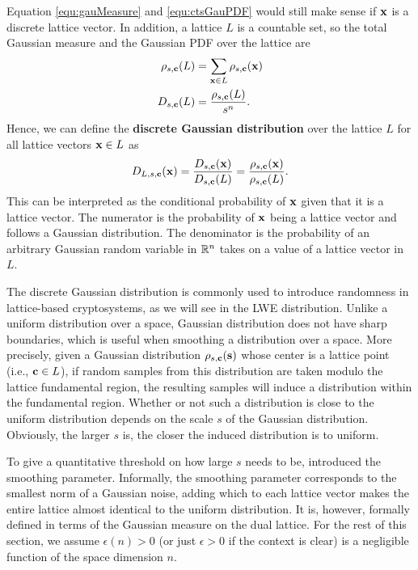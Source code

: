 \documentclass[../main.tex]{subfiles}
\begin{document}
Equation \ref{equ:gauMeasure} and \ref{equ:ctsGauPDF} would still make sense if $\mathbf{x}$ is a discrete lattice vector. In addition, a lattice $L$ is a countable set, so the total Gaussian measure and the Gaussian PDF over the lattice are  
\begin{align*}
    \rho_{s,\mathbf{c}}(L) &= \sum_{\mathbf{x} \in L} \rho_{s,\mathbf{c}}(\mathbf{x})\\
    D_{s,\mathbf{c}}(L) &= \frac{\rho_{s,\mathbf{c}}(L)}{s^n}.
\end{align*}
Hence, we can define the \textbf{discrete Gaussian distribution}  
\reversemarginpar
{}
over the lattice $L$ for all lattice vectors $\mathbf{x} \in L$ as 
\begin{equation*}
    D_{L,s,\mathbf{c}}(\mathbf{x}) = \frac{D_{s,\mathbf{c}}(\mathbf{x})}{D_{s,\mathbf{c}}(L)} = \frac{\rho_{s,\mathbf{c}}(\mathbf{x})}{\rho_{s,\mathbf{c}}(L)}.
\end{equation*}
This can be interpreted as the conditional probability of $\mathbf{x}$ given that it is a lattice vector. The numerator is the probability of $\mathbf{x}$ being a lattice vector and follows a Gaussian distribution. The denominator is the probability of an arbitrary Gaussian random variable in $\mathbb{R}^n$ takes on a value of a lattice vector in $L$. 

The discrete Gaussian distribution is commonly used to introduce randomness in lattice-based cryptosystems, as we will see in the LWE distribution. Unlike a uniform distribution over a space, Gaussian distribution does not have sharp boundaries, which is useful when smoothing a distribution over a space. More precisely, given a Gaussian distribution $\rho_{s,\mathbf{c}}(\mathbf{s})$ whose center is a lattice point (i.e., $\mathbf{c} \in L$), if random samples from this distribution are taken modulo the lattice fundamental region, the resulting samples will induce a distribution within the fundamental region. Whether or not such a distribution is close to the uniform distribution depends on the scale $s$ of the Gaussian distribution. Obviously, the larger $s$ is, the closer the induced distribution is to uniform. 

To give a quantitative threshold on how large $s$ needs to be, \citet{micciancio07worst} introduced the smoothing parameter. Informally, the smoothing parameter corresponds to the smallest norm of a Gaussian noise, adding which to each lattice vector makes the entire lattice almost identical to the uniform distribution. It is, however, formally defined in terms of the Gaussian measure on the dual lattice. %
For the rest of this section, we assume $\epsilon(n)>0$ (or just $\epsilon>0$ if the context is clear) is a negligible function of the space dimension $n$.   
\end{document}
